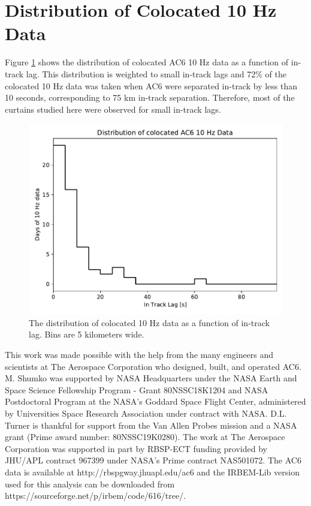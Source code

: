 \documentclass[draft]{agujournal2019}
\begin{document}
\appendix

\section{Distribution of Colocated 10 Hz Data}
Figure \ref{a_10Hz_dist} shows the distribution of colocated AC6 10 Hz data as a function of in-track lag. This distribution is weighted to small in-track lags and 72\% of the colocated 10 Hz data was taken when AC6 were separated in-track by less than 10 seconds, corresponding to 75 km in-track separation. Therefore, most of the curtains studied here were observed for small in-track lags.

\begin{figure}
\includegraphics[width=\textwidth]{a_10hz_dist.pdf}
\caption{The distribution of colocated 10 Hz data as a function of in-track lag. Bins are 5 kilometers wide.}
\label{a_10Hz_dist}
\end{figure}

\acknowledgments
This work was made possible with the help from the many engineers and scientists at The Aerospace Corporation who designed, built, and operated AC6. M. Shumko was supported by NASA Headquarters under the NASA Earth and Space Science Fellowship Program - Grant 80NSSC18K1204 and NASA Postdoctoral Program at the NASA's Goddard Space Flight Center, administered by Universities Space Research Association under contract with NASA. D.L. Turner is thankful for support from the Van Allen Probes mission and a NASA grant (Prime award number: 80NSSC19K0280). The work at The Aerospace Corporation was supported in part by RBSP-ECT funding provided by JHU/APL contract 967399 under NASA's Prime contract NAS501072. The AC6 data is available at http://rbspgway.jhuapl.edu/ac6 and the IRBEM-Lib version used for this analysis can be downloaded from https://sourceforge.net/p/irbem/code/616/tree/.


%
\end{document}
